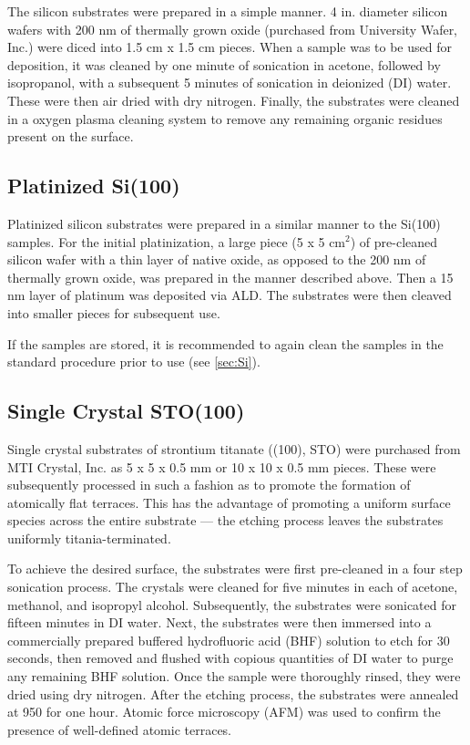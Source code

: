 The silicon substrates were prepared in a simple manner. 4 in. diameter silicon wafers with 200 nm of thermally grown oxide (purchased from University Wafer, Inc.\cite{strem_inc}) were diced into 1.5 cm x 1.5 cm pieces. When a sample was to be used for deposition, it was cleaned by one minute of sonication in acetone, followed by isopropanol, with a subsequent 5 minutes of sonication in deionized (DI) water. These were then air dried with dry nitrogen. Finally, the substrates were cleaned in a oxygen plasma cleaning system to remove any remaining organic residues present on the surface.\cite{kern_handbook_1993} 



\subsection{Platinized Si(100)}

Platinized silicon substrates were prepared in a similar manner to the Si(100) samples. For the initial platinization, a large piece (5 x 5 cm$^{2}$) of pre-cleaned silicon wafer with a thin layer of native oxide, as opposed to the 200 nm of thermally grown oxide, was prepared in the manner described above.\cite{kern_handbook_1993} Then a 15 nm layer of platinum was deposited via ALD.\cite{Ritala_2003_Pt} The substrates were then cleaved into smaller pieces for subsequent use. 

If the samples are stored, it is recommended to again clean the samples in the standard procedure prior to use (see \vref{sec:Si}).


\subsection{Single Crystal STO(100)}

Single crystal substrates of strontium titanate ((100), STO) were purchased from MTI Crystal, Inc.\cite{MTIXtal_inc} as 5 x 5 x 0.5 mm or 10 x 10 x 0.5 mm pieces. These were subsequently processed in such a fashion as to promote the formation of atomically flat terraces. This has the advantage of promoting a uniform surface species across the entire substrate --- the etching process leaves the substrates uniformly titania-terminated.\cite{koster_quasi-ideal_1998}

To achieve the desired surface, the substrates were first pre-cleaned in a four step sonication process. The crystals were cleaned for five minutes in each of acetone, methanol, and isopropyl alcohol. Subsequently, the substrates were sonicated for fifteen minutes in DI water.\cite{koster_quasi-ideal_1998} Next, the substrates were then immersed into a commercially prepared buffered hydrofluoric acid (BHF) solution to etch for 30 seconds, then removed and flushed with copious quantities of DI water to purge any remaining BHF solution.  Once the sample were thoroughly rinsed, they were dried using dry nitrogen. After the etching process, the substrates were annealed at 950\degC{} for one hour.\cite{koster_quasi-ideal_1998} Atomic force microscopy (AFM) was used to confirm the presence of well-defined atomic terraces. 

